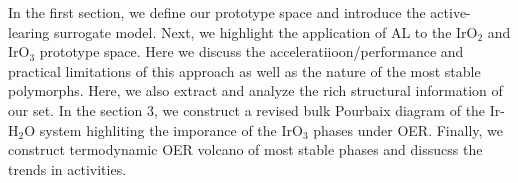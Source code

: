 %
In the first section, we define our prototype space and introduce the active-learing surrogate model.
%
Next, we highlight the application of AL to the IrO$_2$ and IrO$_3$ prototype space.
%
Here we discuss the acceleratiioon/performance and practical limitations of this approach as well as the nature of the most stable polymorphs.
%
Here, we also extract and analyze the rich structural information of our set.
%
In the section 3, we construct a revised bulk Pourbaix diagram of the Ir-H$_2$O system highliting the imporance of the IrO$_3$ phases under OER.
%
Finally, we construct termodynamic OER volcano of most stable phases and dissucss the trends in activities.











